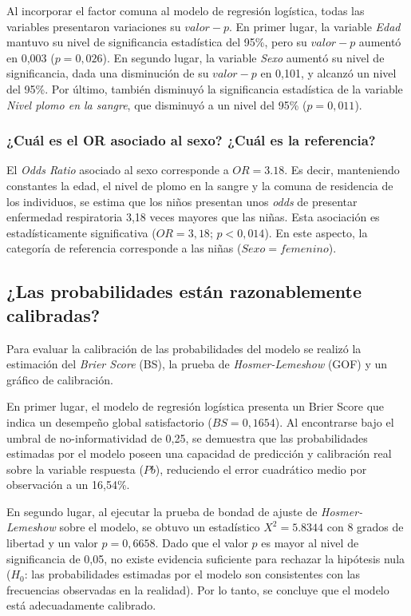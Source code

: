\documentclass[
  english,
  10pt,
  letterpaper,
  DIV=11,
  numbers=noendperiod]{scrartcl}
\begin{document}
Al incorporar el factor comuna al modelo de regresión logística, todas
las variables presentaron variaciones su \(valor-p\). En primer lugar,
la variable \emph{Edad} mantuvo su nivel de significancia estadística
del 95\%, pero su \(valor-p\) aumentó en 0,003 (\(p=0,026\)). En segundo
lugar, la variable \emph{Sexo} aumentó su nivel de significancia, dada
una disminución de su \(valor-p\) en 0,101, y alcanzó un nivel del 95\%.
Por último, también disminuyó la significancia estadística de la
variable \emph{Nivel plomo en la sangre}, que disminuyó a un nivel del
95\% (\(p=0,011\)).

\subsubsection{¿Cuál es el OR asociado al sexo? ¿Cuál es la
referencia?}\label{cuuxe1l-es-el-or-asociado-al-sexo-cuuxe1l-es-la-referencia}

El \emph{Odds Ratio} asociado al sexo corresponde a \(OR=3.18\). Es
decir, manteniendo constantes la edad, el nivel de plomo en la sangre y
la comuna de residencia de los individuos, se estima que los niños
presentan unos \emph{odds} de presentar enfermedad respiratoria 3,18
veces mayores que las niñas. Esta asociación es estadísticamente
significativa (\(OR = 3,18\); \(p<0,014\)). En este aspecto, la
categoría de referencia corresponde a las niñas (\(Sexo = femenino\)).

\subsection{¿Las probabilidades están razonablemente
calibradas?}\label{las-probabilidades-estuxe1n-razonablemente-calibradas}

Para evaluar la calibración de las probabilidades del modelo se realizó
la estimación del \emph{Brier Score} (BS), la prueba de
\emph{Hosmer-Lemeshow} (GOF) y un gráfico de calibración.

En primer lugar, el modelo de regresión logística presenta un Brier
Score que indica un desempeño global satisfactorio (\(BS = 0,1654\)). Al
encontrarse bajo el umbral de no-informatividad de 0,25, se demuestra
que las probabilidades estimadas por el modelo poseen una capacidad de
predicción y calibración real sobre la variable respuesta (\(Pb\)),
reduciendo el error cuadrático medio por observación a un 16,54\%.

En segundo lugar, al ejecutar la prueba de bondad de ajuste de
\emph{Hosmer-Lemeshow} sobre el modelo, se obtuvo un estadístico
\(X^2=5.8344\) con 8 grados de libertad y un valor \(p = 0,6658\). Dado
que el valor \(p\) es mayor al nivel de significancia de 0,05, no existe
evidencia suficiente para rechazar la hipótesis nula (\(H_0\): las
probabilidades estimadas por el modelo son consistentes con las
frecuencias observadas en la realidad). Por lo tanto, se concluye que el
modelo está adecuadamente calibrado.
\end{document}
